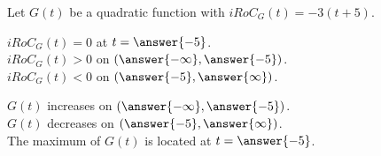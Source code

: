 \documentclass{ximera}
\author{Lee Wayand}
\begin{document}
\begin{exercise} 









Let $G(t)$ be a quadratic function with $iRoC_G(t) = -3(t+5)$. \\






\begin{question}



$iRoC_G(t) = 0$  at  $t = \answer{-5}$. \\


$iRoC_G(t) > 0$ on $\left( \answer{-\infty}, \answer{-5} \right)$. \\


$iRoC_G(t) < 0$ on $\left( \answer{-5}, \answer{\infty} \right)$. \\

\end{question}





\begin{question}



$G(t)$ increases on $\left( \answer{-\infty}, \answer{-5} \right)$. \\


$G(t)$ decreases on $\left( \answer{-5}, \answer{\infty} \right)$. \\


The maximum of $G(t)$ is located at  $t = \answer{-5}$. \\

\end{question}
















\end{exercise}
\end{document}
